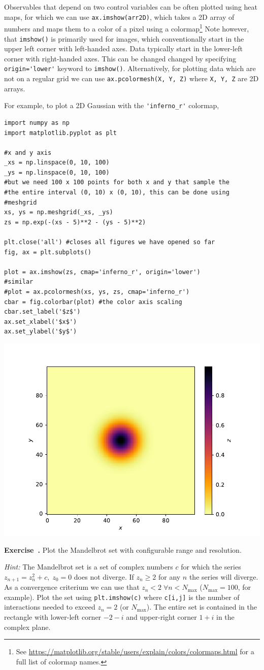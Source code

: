 \documentclass{article}
\newcommand{\ls}[1]{\lstinline{#1}}
\newcounter{exercise}
\newenvironment{exercise}[1][]%
    {\refstepcounter{exercise}%
    \begin{mdframed}[backgroundcolor=exercise,linecolor=white]%
    \textbf{Exercise~\theexercise.} #1 \rmfamily}%
    {\medskip\end{mdframed}}
\begin{document}
Observables that depend on two control variables can be often plotted using heat maps, for which we can use \ls{ax.imshow(arr2D)}, which takes a 2D array of numbers and maps them to a color of a pixel using a colormap\footnote{See \url{https://matplotlib.org/stable/users/explain/colors/colormaps.html} for a full list of colormap names.} Note however, that \ls{imshow()} is primarily used for images, which conventionally start in the upper left corner with left-handed axes. Data typically start in the lower-left corner with right-handed axes. This can be changed changed by specifying \ls{origin='lower'} keyword to \ls{imshow()}. Alternatively, for plotting data which are not on a regular grid we can use \ls{ax.pcolormesh(X, Y, Z)} where \ls{X, Y, Z} are 2D arrays.

For example, to plot a 2D Gaussian with the \ls{'inferno_r'} colormap,
\begin{lstlisting}[caption=Two-dimensional plotting example.]
import numpy as np
import matplotlib.pyplot as plt

#x and y axis
_xs = np.linspace(0, 10, 100)
_ys = np.linspace(0, 10, 100)
#but we need 100 x 100 points for both x and y that sample the 
#the entire interval (0, 10) x (0, 10), this can be done using
#meshgrid
xs, ys = np.meshgrid(_xs, _ys)
zs = np.exp(-(xs - 5)**2 - (ys - 5)**2)

plt.close('all') #closes all figures we have opened so far
fig, ax = plt.subplots()

plot = ax.imshow(zs, cmap='inferno_r', origin='lower')
#similar
#plot = ax.pcolormesh(xs, ys, zs, cmap='inferno_r') 
cbar = fig.colorbar(plot) #the color axis scaling
cbar.set_label('$z$')
ax.set_xlabel('$x$')
ax.set_ylabel('$y$')
\end{lstlisting}
\begin{center}
    \includegraphics[width=0.5\linewidth]{gaussian_2D.pdf}
\end{center}
\begin{exercise}
    Plot the Mandelbrot set with configurable range and resolution.

    \emph{Hint:} The Mandelbrot set is a set of complex numbers $c$ for which the series $z_{n+1} = z_n^2 + c,\; z_0 = 0$ does not diverge. If $z_n \geq 2$ for any $n$ the series will diverge. As a convergence criterium we can use that $z_n < 2\; \forall n < N_\mathrm{max}$ ($N_\mathrm{max} = 100$, for example). Plot the set using \ls{plt.imshow(c)} where \ls{c[i,j]} is the number of interactions needed to exceed $z_n = 2$ (or $N_\mathrm{max}$). The entire set is contained in the rectangle with lower-left corner $-2-i$ and upper-right corner $1+i$ in the complex plane.
\end{exercise}
\end{document}
